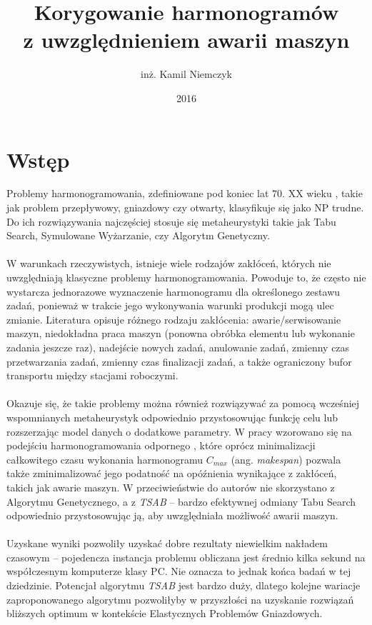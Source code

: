 \documentclass[archivemode]{mgr}
\title{Korygowanie harmonogramów\\ z uwzględnieniem awarii maszyn}
\author{inż. Kamil Niemczyk}
\date{2016} %
\begin{document}

\maketitle %
\cleardoublepage
\tableofcontents %
\cleardoublepage
%
%
%
%
\chapter*{Wstęp}
Problemy harmonogramowania, zdefiniowane pod koniec lat 70. XX wieku \cite{Garey76}, takie jak problem przepływowy, gniazdowy czy otwarty, klasyfikuje się jako NP trudne. Do ich rozwiązywania najczęściej stosuje się metaheurystyki takie jak Tabu Search, Symulowane Wyżarzanie, czy Algorytm Genetyczny.\\\\
W warunkach rzeczywistych, istnieje wiele rodzajów zakłóceń, których nie uwzględniają klasyczne problemy harmonogramowania. Powoduje to, że często nie wystarcza jednorazowe wyznaczenie harmonogramu dla określonego zestawu zadań, ponieważ w trakcie jego wykonywania warunki produkcji mogą ulec zmianie. Literatura opisuje różnego rodzaju zakłócenia: awarie/serwisowanie maszyn, niedokładna praca maszyn (ponowna obróbka elementu lub wykonanie zadania jeszcze raz), nadejście nowych zadań, anulowanie zadań, zmienny czas przetwarzania zadań, zmienny czas finalizacji zadań, a także ograniczony bufor transportu między stacjami roboczymi.\\\\
Okazuje się, że takie problemy można również rozwiązywać za pomocą wcześniej wspomnianych metaheurystyk odpowiednio przystosowując funkcję celu lub rozszerzając model danych o dodatkowe parametry. W pracy wzorowano się na podejściu harmonogramowania odpornego \cite{RFJSRMB_ElMekkawy11}, które oprócz minimalizacji całkowitego czasu wykonania harmonogramu $C_{max}$ (ang. \emph{makespan}) pozwala także zminimalizować jego podatność na opóźnienia wynikające z zakłóceń, takich jak awarie maszyn.  W przeciwieństwie do autorów \cite{RFJSRMB_ElMekkawy11} nie skorzystano z Algorytmu Genetycznego, a z \emph{TSAB} \cite{Smutnicki96} -- bardzo efektywnej odmiany Tabu Search odpowiednio przystosowując ją, aby uwzględniała możliwość awarii maszyn.\\\\
Uzyskane wyniki pozwoliły uzyskać dobre rezultaty niewielkim nakładem czasowym -- pojedencza instancja problemu obliczana jest średnio kilka sekund na współczesnym komputerze klasy PC. Nie oznacza to jednak końca badań w tej dziedzinie. Potencjał algorytmu \emph{TSAB} jest bardzo duży, dlatego kolejne wariacje zaproponowanego algorytmu pozwoliłyby w przyszłości na uzyskanie rozwiązań bliższych optimum w kontekście Elastycznych Problemów Gniazdowych.
%
\end{document}
